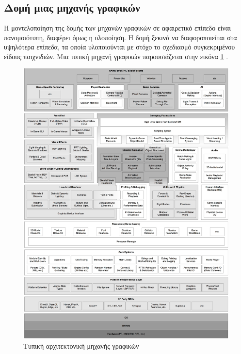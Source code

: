\subsection{Δομή μιας μηχανής γραφικών}
Η μοντελοποίηση της δομής των μηχανών γραφικών σε αφαιρετικό επίπεδο είναι πανομοιότυπη, διαφέρει όμως η υλοποίηση. Η δομή ξεκινά να διαφοροποιείται στα υψηλότερα επίπεδα, τα οποία υλοποιούνται με στόχο το σχεδιασμό συγκεκριμένου είδους παιχνιδιών. Μια τυπική μηχανή γραφικών παρουσιάζεται στην εικόνα \ref{fig:Game_Engine_Architecture} \cite{gregory2009game}.
	\begin{figure}
		\centering
		\includegraphics[width=160mm]{Images/game_engine_architecture}
		\caption{Τυπική αρχιτεκτονική μηχανής γραφικών}
		\label{fig:Game_Engine_Architecture}
	\end{figure}	

